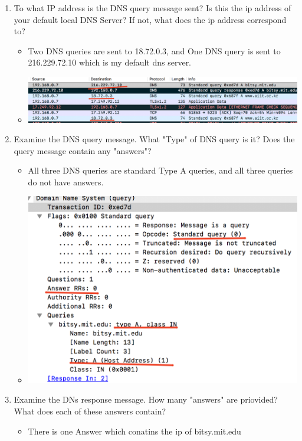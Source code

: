 \documentclass{article}
\begin{document}
\begin{itemize}
\begin{enumerate}
      \item To what IP address is the DNS query message sent?  Is this the ip address of your default local DNS Server?  If not, what does the ip address correspond to?
      \begin{itemize}
        \item Two DNS queries are sent to 18.72.0.3, and One DNS query is sent to 216.229.72.10 which is my default dns server.  
        \item \includegraphics[scale=0.5]{images/DNS20.png}
      \end{itemize}
      \item Examine the DNS query message.  What "Type" of DNS query is it?  Does the query message contain any "answers"?
      \begin{itemize}
        \item All three DNS queries are standard Type A queries, and all three queries do not have answers.
        \item \includegraphics[scale=0.5]{images/DNS21.png}
      \end{itemize}
      \item Examine the DNs response message.  How many "answers" are priovided?  What does each of these answers contain?
      \begin{itemize}
        \item There is one Answer which conatins the ip of bitsy.mit.edu

\end{itemize}
\end{enumerate}
\end{itemize}
\end{document}
